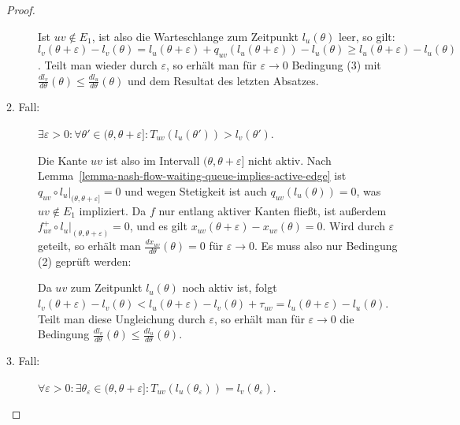 \begin{proof}
\begin{description}
		Ist $uv\notin E_1$, ist also die Warteschlange zum Zeitpunkt $l_u(\theta)$ leer, so gilt: $l_v(\theta+\varepsilon) - l_v(\theta) = l_u(\theta + \varepsilon) + q_{uv}(l_u(\theta + \varepsilon)) - l_u(\theta) \geq l_u(\theta + \varepsilon) - l_u(\theta)$.
		Teilt man wieder durch $\varepsilon$, so erhält man für $\varepsilon  \rightarrow 0$ Bedingung (3) mit $\frac{dl_v}{d\theta}(\theta) \leq \frac{dl_u}{d\theta}(\theta)$ und dem Resultat des letzten Absatzes.
		
		\item[2. Fall:] $\exists \varepsilon > 0: \forall \theta'\in(\theta, \theta + \varepsilon]: T_{uv}(l_u(\theta'))>l_v(\theta')$.
		
		Die Kante ${uv}$ ist also im Intervall $(\theta, \theta + \varepsilon]$ nicht aktiv.
		Nach Lemma~\ref{lemma-nash-flow-waiting-queue-implies-active-edge} ist $q_{uv} \circ l_u\big|_{(\theta, \theta+\varepsilon]}=0$ und wegen Stetigkeit ist auch $q_{uv}(l_u(\theta))=0$, was $uv\notin E_1$ impliziert.
		Da $f$ nur entlang aktiver Kanten fließt, ist außerdem $f_{uv}^+ \circ l_u \big|_{(\theta, \theta+\varepsilon)} = 0$, und es gilt $x_{uv}(\theta + \varepsilon) - x_{uv}(\theta)=0$.
		Wird durch $\varepsilon$ geteilt, so erhält man $\frac{dx_{uv}}{d\theta}(\theta) = 0$ für $\varepsilon\rightarrow0$.
		Es muss also nur Bedingung (2) geprüft werden:
		
		
		Da $uv$ zum Zeitpunkt $l_u(\theta)$ noch aktiv ist, folgt $l_v(\theta + \varepsilon) - l_v(\theta) < l_u(\theta+\varepsilon) - l_v(\theta) + \tau_{uv} = l_u(\theta + \varepsilon) - l_u(\theta)$.
		Teilt man diese Ungleichung  durch $\varepsilon$, so erhält man für $\varepsilon\rightarrow 0$ die Bedingung $\frac{dl_v}{d\theta}(\theta)\leq\frac{dl_u}{d\theta}(\theta)$.
		
		\item[3. Fall:] $\forall \varepsilon>0: \exists \theta_{\varepsilon}\in (\theta, \theta+\varepsilon]: T_{uv}(l_u(\theta_\varepsilon)) = l_v(\theta_\varepsilon)$.
		

\end{description}
\end{proof}
